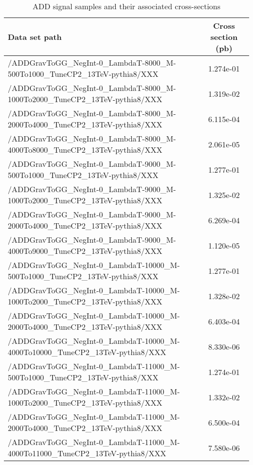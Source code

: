\begin{landscape}
\begin{table}[!htbp]
       \caption{ ADD signal samples and their associated cross-sections }
       \centering
       \vspace{\baselineskip}
       \begin{tabular}{lc}
       \hline \hline
       Data set path & Cross section (pb)\\
       \hline

/ADDGravToGG\_NegInt-0\_LambdaT-8000\_M-500To1000\_TuneCP2\_13TeV-pythia8/XXX &  1.274e-01\\
/ADDGravToGG\_NegInt-0\_LambdaT-8000\_M-1000To2000\_TuneCP2\_13TeV-pythia8/XXX &  1.319e-02\\
/ADDGravToGG\_NegInt-0\_LambdaT-8000\_M-2000To4000\_TuneCP2\_13TeV-pythia8/XXX &  6.115e-04\\
/ADDGravToGG\_NegInt-0\_LambdaT-8000\_M-4000To8000\_TuneCP2\_13TeV-pythia8/XXX &  2.061e-05\\
/ADDGravToGG\_NegInt-0\_LambdaT-9000\_M-500To1000\_TuneCP2\_13TeV-pythia8/XXX &  1.277e-01\\
/ADDGravToGG\_NegInt-0\_LambdaT-9000\_M-1000To2000\_TuneCP2\_13TeV-pythia8/XXX &  1.325e-02\\
/ADDGravToGG\_NegInt-0\_LambdaT-9000\_M-2000To4000\_TuneCP2\_13TeV-pythia8/XXX &  6.269e-04\\
/ADDGravToGG\_NegInt-0\_LambdaT-9000\_M-4000To9000\_TuneCP2\_13TeV-pythia8/XXX &  1.120e-05\\
/ADDGravToGG\_NegInt-0\_LambdaT-10000\_M-500To1000\_TuneCP2\_13TeV-pythia8/XXX &  1.277e-01\\
/ADDGravToGG\_NegInt-0\_LambdaT-10000\_M-1000To2000\_TuneCP2\_13TeV-pythia8/XXX &  1.328e-02\\
/ADDGravToGG\_NegInt-0\_LambdaT-10000\_M-2000To4000\_TuneCP2\_13TeV-pythia8/XXX &  6.403e-04\\
/ADDGravToGG\_NegInt-0\_LambdaT-10000\_M-4000To10000\_TuneCP2\_13TeV-pythia8/XXX &  8.330e-06\\
/ADDGravToGG\_NegInt-0\_LambdaT-11000\_M-500To1000\_TuneCP2\_13TeV-pythia8/XXX &  1.274e-01\\
/ADDGravToGG\_NegInt-0\_LambdaT-11000\_M-1000To2000\_TuneCP2\_13TeV-pythia8/XXX &  1.332e-02\\
/ADDGravToGG\_NegInt-0\_LambdaT-11000\_M-2000To4000\_TuneCP2\_13TeV-pythia8/XXX &  6.500e-04\\
/ADDGravToGG\_NegInt-0\_LambdaT-11000\_M-4000To11000\_TuneCP2\_13TeV-pythia8/XXX &  7.580e-06\\


       \hline \hline
       \end{tabular}
       \label{table:ADD_signal_samples_xsec}
\end{table}
\end{landscape}


